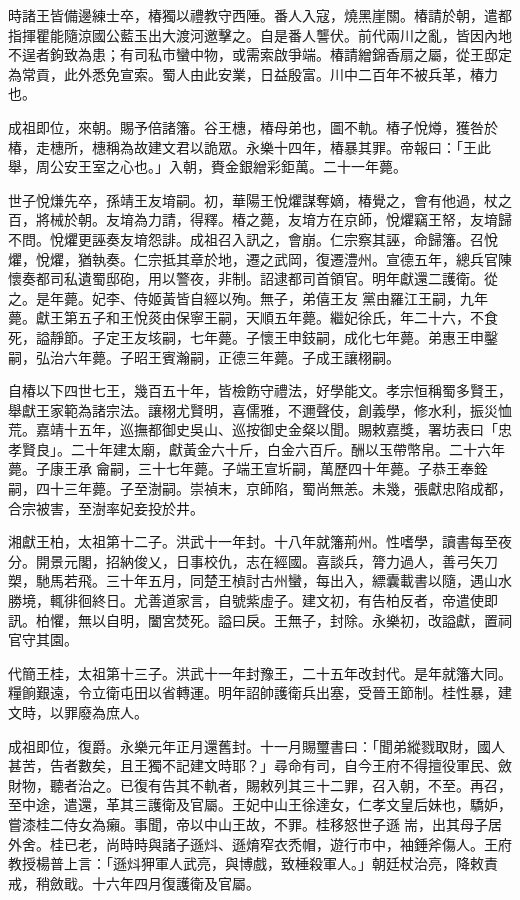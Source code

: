 時諸王皆備邊練士卒，椿獨以禮教守西陲。番人入寇，燒黑崖關。椿請於朝，遣都指揮瞿能隨涼國公藍玉出大渡河邀擊之。自是番人讋伏。前代兩川之亂，皆因內地不逞者鉤致為患；有司私市蠻中物，或需索啟爭端。椿請繒錦香扇之屬，從王邸定為常貢，此外悉免宣索。蜀人由此安業，日益殷富。川中二百年不被兵革，椿力也。

成祖即位，來朝。賜予倍諸籓。谷王橞，椿母弟也，圖不軌。椿子悅燇，獲咎於椿，走橞所，橞稱為故建文君以詭眾。永樂十四年，椿暴其罪。帝報曰：「王此舉，周公安王室之心也。」入朝，賚金銀繒彩鉅萬。二十一年薨。

世子悅熑先卒，孫靖王友堉嗣。初，華陽王悅爠謀奪嫡，椿覺之，會有他過，杖之百，將械於朝。友堉為力請，得釋。椿之薨，友堉方在京師，悅爠竊王帑，友堉歸不問。悅爠更誣奏友堉怨誹。成祖召入訊之，會崩。仁宗察其誣，命歸籓。召悅爠，悅爠，猶執奏。仁宗抵其章於地，遷之武岡，復遷澧州。宣德五年，總兵官陳懷奏都司私遺蜀邸砲，用以警夜，非制。詔逮都司首領官。明年獻還二護衛。從之。是年薨。妃李、侍姬黃皆自經以殉。無子，弟僖王友黨由羅江王嗣，九年薨。獻王第五子和王悅菼由保寧王嗣，天順五年薨。繼妃徐氏，年二十六，不食死，謚靜節。子定王友垓嗣，七年薨。子懷王申鈘嗣，成化七年薨。弟惠王申鑿嗣，弘治六年薨。子昭王賓瀚嗣，正德三年薨。子成王讓栩嗣。

自椿以下四世七王，幾百五十年，皆檢飭守禮法，好學能文。孝宗恒稱蜀多賢王，舉獻王家範為諸宗法。讓栩尤賢明，喜儒雅，不邇聲伎，創義學，修水利，振災恤荒。嘉靖十五年，巡撫都御史吳山、巡按御史金粲以聞。賜敕嘉獎，署坊表曰「忠孝賢良」。二十年建太廟，獻黃金六十斤，白金六百斤。酬以玉帶幣帛。二十六年薨。子康王承龠嗣，三十七年薨。子端王宣圻嗣，萬歷四十年薨。子恭王奉銓嗣，四十三年薨。子至澍嗣。崇禎末，京師陷，蜀尚無恙。未幾，張獻忠陷成都，合宗被害，至澍率妃妾投於井。

湘獻王柏，太祖第十二子。洪武十一年封。十八年就籓荊州。性嗜學，讀書每至夜分。開景元閣，招納俊乂，日事校仇，志在經國。喜談兵，膂力過人，善弓矢刀槊，馳馬若飛。三十年五月，同楚王楨討古州蠻，每出入，縹囊載書以隨，遇山水勝境，輒徘徊終日。尤善道家言，自號紫虛子。建文初，有告柏反者，帝遣使即訊。柏懼，無以自明，闔宮焚死。謚曰戾。王無子，封除。永樂初，改謚獻，置祠官守其園。

代簡王桂，太祖第十三子。洪武十一年封豫王，二十五年改封代。是年就籓大同。糧餉艱遠，令立衛屯田以省轉運。明年詔帥護衛兵出塞，受晉王節制。桂性暴，建文時，以罪廢為庶人。

成祖即位，復爵。永樂元年正月還舊封。十一月賜璽書曰：「聞弟縱戮取財，國人甚苦，告者數矣，且王獨不記建文時耶？」尋命有司，自今王府不得擅役軍民、斂財物，聽者治之。已復有告其不軌者，賜敕列其三十二罪，召入朝，不至。再召，至中途，遣還，革其三護衛及官屬。王妃中山王徐達女，仁孝文皇后妹也，驕妒，嘗漆桂二侍女為癩。事聞，帝以中山王故，不罪。桂移怒世子遜耑，出其母子居外舍。桂已老，尚時時與諸子遜炓、遜焴窄衣禿帽，遊行市中，袖錘斧傷人。王府教授楊普上言：「遜炓狎軍人武亮，與博戲，致棰殺軍人。」朝廷杖治亮，降敕責戒，稍斂戢。十六年四月復護衛及官屬。

